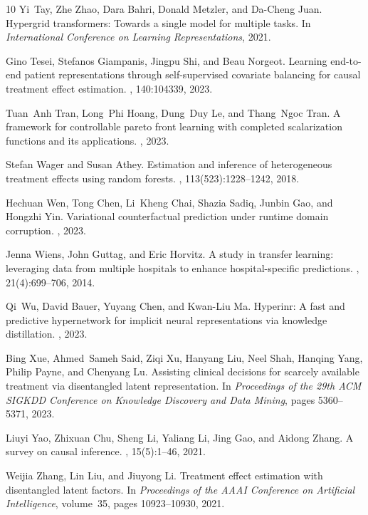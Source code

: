 \documentclass{article}
\begin{document}
\begin{thebibliography}{10}
	Yi~Tay, Zhe Zhao, Dara Bahri, Donald Metzler, and Da-Cheng Juan.
	\newblock Hypergrid transformers: Towards a single model for multiple tasks.
	\newblock In {\em International Conference on Learning Representations}, 2021.
	
	Gino Tesei, Stefanos Giampanis, Jingpu Shi, and Beau Norgeot.
	\newblock Learning end-to-end patient representations through self-supervised
	covariate balancing for causal treatment effect estimation.
	, 140:104339, 2023.
	
	Tuan~Anh Tran, Long~Phi Hoang, Dung~Duy Le, and Thang~Ngoc Tran.
	\newblock A framework for controllable pareto front learning with completed
	scalarization functions and its applications.
	, 2023.
	
	Stefan Wager and Susan Athey.
	\newblock Estimation and inference of heterogeneous treatment effects using
	random forests.
	,
	113(523):1228--1242, 2018.
	
	Hechuan Wen, Tong Chen, Li~Kheng Chai, Shazia Sadiq, Junbin Gao, and Hongzhi
	Yin.
	\newblock Variational counterfactual prediction under runtime domain
	corruption.
	, 2023.
	
	Jenna Wiens, John Guttag, and Eric Horvitz.
	\newblock A study in transfer learning: leveraging data from multiple hospitals
	to enhance hospital-specific predictions.
	,
	21(4):699--706, 2014.
	
	Qi~Wu, David Bauer, Yuyang Chen, and Kwan-Liu Ma.
	\newblock Hyperinr: A fast and predictive hypernetwork for implicit neural
	representations via knowledge distillation.
	, 2023.
	
	Bing Xue, Ahmed~Sameh Said, Ziqi Xu, Hanyang Liu, Neel Shah, Hanqing Yang,
	Philip Payne, and Chenyang Lu.
	\newblock Assisting clinical decisions for scarcely available treatment via
	disentangled latent representation.
	\newblock In {\em Proceedings of the 29th ACM SIGKDD Conference on Knowledge
		Discovery and Data Mining}, pages 5360--5371, 2023.
	
	Liuyi Yao, Zhixuan Chu, Sheng Li, Yaliang Li, Jing Gao, and Aidong Zhang.
	\newblock A survey on causal inference.
	,
	15(5):1--46, 2021.
	
	Weijia Zhang, Lin Liu, and Jiuyong Li.
	\newblock Treatment effect estimation with disentangled latent factors.
	\newblock In {\em Proceedings of the AAAI Conference on Artificial
		Intelligence}, volume~35, pages 10923--10930, 2021.
	
\end{thebibliography}
\end{document}
